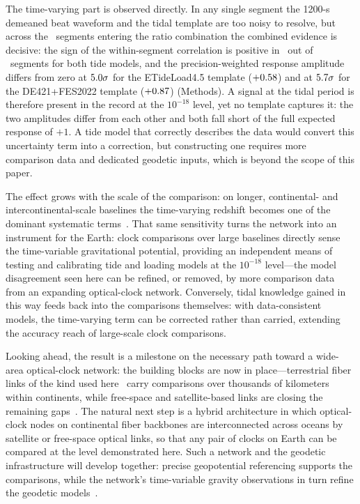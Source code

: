 The time-varying part is observed directly. In any single segment
the 1200-s demeaned beat waveform and the tidal template are too
noisy to resolve, but across the \nSeg~segments entering the ratio
combination the combined evidence is decisive: the sign of the
within-segment correlation is positive in \tidalNegSeg~out of
\nSeg~segments for both tide models, and the precision-weighted
response amplitude differs from zero at $5.0\sigma$ for
the ETideLoad4.5 template ($+0.58$) and at
$5.7\sigma$ for the DE421+FES2022 template
($+0.87$) (Methods). A signal at
the tidal period is therefore
present in the record at the $10^{-18}$ level, yet no template
captures it: the two amplitudes differ from each other and both fall
short of the full expected response of $+1$. A tide model that
correctly describes the data would convert this uncertainty term into
a correction, but constructing one requires more comparison data and
dedicated geodetic inputs, which is beyond the scope of this paper.

The effect grows with the scale of the comparison: on
longer, continental- and intercontinental-scale baselines the
time-varying redshift becomes one of the dominant systematic
terms~\citep{denker2018geodetic}. That same sensitivity turns the
network into an instrument for the Earth: clock comparisons over
large baselines directly sense the time-variable gravitational
potential, providing an independent means of testing and calibrating
tide and loading models at the $10^{-18}$ level---the model
disagreement seen here can be refined, or removed, by more comparison
data from an expanding optical-clock network. Conversely, tidal
knowledge gained in this way feeds back into the comparisons
themselves: with data-consistent models, the time-varying term can be
corrected rather than carried, extending the accuracy reach of
large-scale clock comparisons.

Looking ahead, the result is a milestone on the necessary path
toward a wide-area optical-clock network: the building blocks are now
in place---terrestrial fiber links of the
kind used here~\citep{schioppo2022cavities, chen2026dissemination}
carry comparisons over thousands of kilometers within continents,
while free-space and satellite-based links are closing the remaining
gaps~\citep{pizzocaro2021vlbi, shen2021satellite,
shen2022freespace, caldwell2023geo}. The natural next step is a
hybrid architecture in which optical-clock nodes on continental fiber
backbones are interconnected across oceans by satellite or free-space
optical links, so that any pair of clocks on Earth can be compared at
the level demonstrated here. Such a network and the geodetic
infrastructure will develop together: precise geopotential
referencing supports the comparisons, while the network's
time-variable gravity observations in turn refine the geodetic
models~\citep{grotti2018geodesy, mcgrew2018geodesy}.
